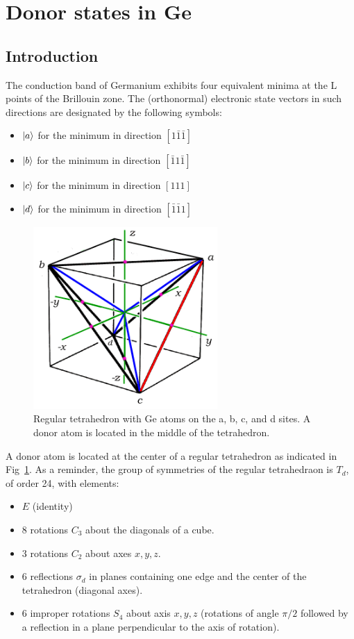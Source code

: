 \section{Donor states in Ge}

\subsection{Introduction}

The conduction band of Germanium exhibits four equivalent minima at
the L points of the Brillouin zone. The (orthonormal) electronic state
vectors in such directions are designated by the following symbols:

\begin{itemize}
\item $\left| a \right>$ for the minimum in direction $[1\bar{1}\bar{1}]$
\item $\left| b \right>$ for the minimum in direction $[\bar{1}1\bar{1}]$
\item $\left| c \right>$ for the minimum in direction $[111]$
\item $\left| d \right>$ for the minimum in direction $[\bar{1}\bar{1}1]$
\end{itemize}

\begin{figure}[h]
  \centering
  \includegraphics[width=7cm]{xyzcube.png}
  \caption{Regular tetrahedron with Ge atoms on the a, b, c,
    and d sites. A donor atom is located in the middle of the tetrahedron.\label{fig:tetra}}
\end{figure}

A donor atom is located at the center of a regular tetrahedron as
indicated in Fig~\ref{fig:tetra}. As a reminder, the group of
symmetries of the regular tetrahedraon is $T_d$, of order 24, with elements:

\begin{itemize}
\item $E$ (identity)
\item 8 rotations  $C_3$ about the diagonals of a cube.
\item 3 rotations $C_2$ about axes $x, y , z$.
\item 6 reflections $\sigma_d$ in planes containing one edge and the center of
  the tetrahedron (diagonal axes).
\item 6 improper rotations $S_4$ about axis $x, y , z$ (rotations
of angle $\pi/2$ followed by a reflection in a plane perpendicular to
the axis of rotation).
\end{itemize}

